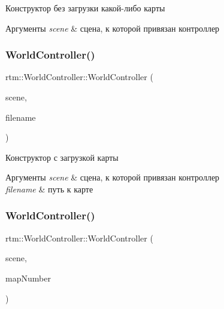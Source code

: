 Конструктор без загрузки какой-\/либо карты 
\begin{DoxyParams}{Аргументы}
{\em scene} & сцена, к которой привязан контроллер \\
\hline
\end{DoxyParams}
\mbox{\label{classrtm_1_1_world_controller_abe5fb63dc74f98dd25e1896d567d5caf}} 
\subsubsection{\texorpdfstring{World\+Controller()}{WorldController()}\hspace{0.1cm}{\footnotesize\ttfamily [2/3]}}
{\footnotesize\ttfamily rtm\+::\+World\+Controller\+::\+World\+Controller (\begin{DoxyParamCaption}\item[{\hyperlink{classrtm_1_1_world_scene}{World\+Scene} $\ast$const}]{scene,  }\item[{std\+::string const \&}]{filename }\end{DoxyParamCaption})}

Конструктор с загрузкой карты 
\begin{DoxyParams}{Аргументы}
{\em scene} & сцена, к которой привязан контроллер \\
\hline
{\em filename} & путь к карте \\
\hline
\end{DoxyParams}
\mbox{\label{classrtm_1_1_world_controller_ac2f5bcddd4192807bb5ea30440d3defc}} 
\subsubsection{\texorpdfstring{World\+Controller()}{WorldController()}\hspace{0.1cm}{\footnotesize\ttfamily [3/3]}}
{\footnotesize\ttfamily rtm\+::\+World\+Controller\+::\+World\+Controller (\begin{DoxyParamCaption}\item[{\hyperlink{classrtm_1_1_world_scene}{World\+Scene} $\ast$const}]{scene,  }\item[{size\+\_\+t}]{map\+Number }\end{DoxyParamCaption})}


